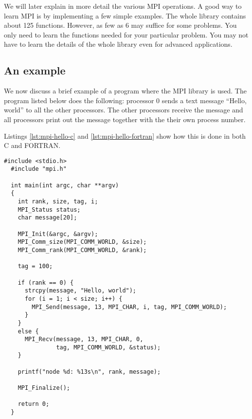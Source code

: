 We will later explain in more detail the various MPI operations. A good way to
learn MPI is by implementing a few simple examples. The whole library contains
about 125 functions. However, as few as 6 may suffice for some problems. You
only need to learn the functions needed for your particular problem. You may not
have to learn the details of the whole library even for advanced applications.

\subsection{An example}

We now discuss a brief example of a program where the MPI library is used. The
program listed below does the following: processor 0 sends a text message
``Hello, world'' to all the other processors. The other processors receive the
message and all processors print out the message together with the their own
process number.

Listings \ref{lst:mpi-hello-c} and \ref{lst:mpi-hello-fortran} show how this is
done in both C and FORTRAN.

\begin{lstlisting}[style=c, float, caption={Hello world MPI in C.}, label=lst:mpi-hello-c]
  #include <stdio.h>
  #include "mpi.h"

  int main(int argc, char **argv)
  {
    int rank, size, tag, i;
    MPI_Status status;
    char message[20];

    MPI_Init(&argc, &argv);
    MPI_Comm_size(MPI_COMM_WORLD, &size);
    MPI_Comm_rank(MPI_COMM_WORLD, &rank);

    tag = 100;

    if (rank == 0) {
      strcpy(message, "Hello, world");
      for (i = 1; i < size; i++) {
        MPI_Send(message, 13, MPI_CHAR, i, tag, MPI_COMM_WORLD);
      }
    }
    else {
      MPI_Recv(message, 13, MPI_CHAR, 0,
               tag, MPI_COMM_WORLD, &status);
    }

    printf("node %d: %13s\n", rank, message);

    MPI_Finalize();

    return 0;
  }
\end{lstlisting}

